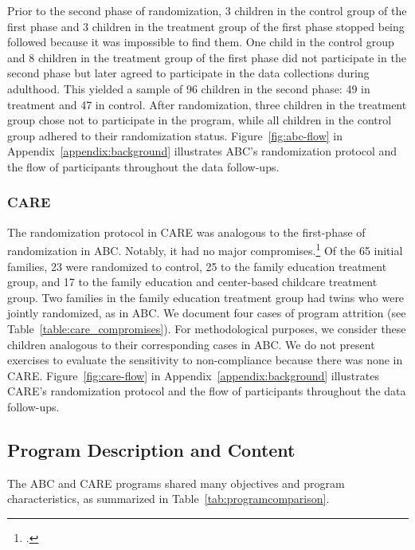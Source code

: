 \noindent Prior to the second phase of randomization, 3 children in the control group of the first phase and 3 children in the treatment group of the first phase stopped being followed because it was impossible to find them. One child in the control group and 8 children in the treatment group of the first phase did not participate in the second phase but later agreed to participate in the data collections during adulthood. This yielded a sample of 96 children in the second phase: 49 in treatment and 47 in control. After randomization, three children in the treatment group chose not to participate in the program, while all children in the control group adhered to their randomization status. Figure~\ref{fig:abc-flow} in Appendix~\ref{appendix:background} illustrates ABC's randomization protocol and the flow of participants throughout the data follow-ups.\\

\subsubsection{CARE}

\noindent The randomization protocol in CARE was analogous to the first-phase of randomization in ABC. Notably, it had no major compromises.\footnote{\citet{Bryant1987TIECSE,Wasik_Ramey_etal_1990_CD,Burchinal_Campbell_etal_1997_CD}.} Of the 65 initial families, 23 were randomized to control, 25 to the family education treatment group, and 17 to the family education and center-based childcare treatment group. Two families in the family education treatment group had twins who were jointly randomized, as in ABC. We document four cases of program attrition (see Table~\ref{table:care_compromises}). For methodological purposes, we consider these children analogous to their corresponding cases in ABC. We do not present exercises to evaluate the sensitivity to non-compliance because there was none in CARE. Figure~\ref{fig:care-flow} in Appendix~\ref{appendix:background} illustrates CARE's randomization protocol and the flow of participants throughout the data follow-ups.\\



\subsection{Program Description and Content}

\noindent The ABC and CARE programs shared many objectives and program characteristics, as summarized in Table~\ref{tab:programcomparison}.\\

